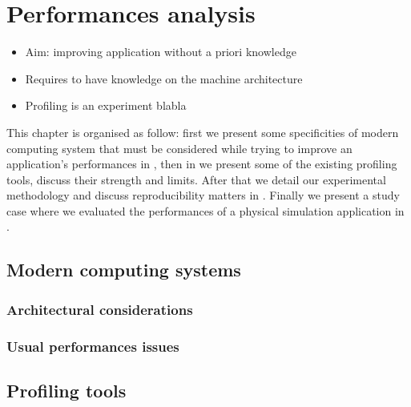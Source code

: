 \chapter{Performances analysis}
\label{chap:perf}

\begin{itemize}
    \item Aim: improving application without a priori knowledge
    \item Requires to have knowledge on the  machine architecture
    \item Profiling is an experiment blabla
\end{itemize}

This chapter is organised as follow: first we present some specificities of
modern computing system that must be considered while trying to improve an
application's performances in , then in  we
present some of the existing profiling tools, discuss their strength and
limits. After that we detail our experimental methodology and discuss
reproducibility matters in . Finally we present a study
case where we evaluated the performances of a physical simulation application
in .

\section{Modern computing systems}
\label{sec:mod-syst}

\subsection{Architectural considerations}


\subsection{Usual performances issues}



\section{Profiling tools}
\label{sec:prof-tools}



